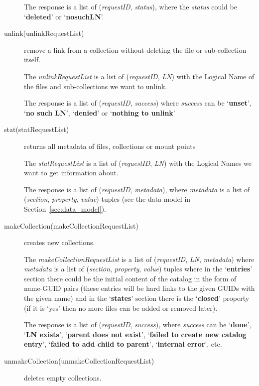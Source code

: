\documentclass{book}
\begin{document}
\begin{description}
    The response is a list of (\emph{requestID}, \emph{status}), where the \emph{status} could be `\textbf{deleted}' or `\textbf{nosuchLN}'.
        
    \item[unlink(unlinkRequestList)] remove a link from a collection without deleting the file or sub-collection itself.
    
    The \emph{unlinkRequestList} is a list of (\emph{requestID}, \emph{LN}) with the Logical Name of the files and sub-collections we want to unlink.
    
    The response is a list of (\emph{requestID}, \emph{success}) where \emph{success} can be `\textbf{unset}', `\textbf{no such LN}', `\textbf{denied}' or `\textbf{nothing to unlink}'
    
    \item[stat(statRequestList)] returns all metadata of files, collections or mount points

    The \emph{statRequestList} is a list of (\emph{requestID}, \emph{LN}) with the Logical Names we want to get information about.
    
    The response is a list of (\emph{requestID}, \emph{metadata}), where \emph{metadata} is a list of (\emph{section}, \emph{property}, \emph{value}) tuples (see the data model in Section~\ref{sec:data_model}).
    
    \item[makeCollection(makeCollectionRequestList)] creates new collections.
    
    The \emph{makeCollectionRequestList} is a list of (\emph{requestID}, \emph{LN}, \emph{metadata}) where \emph{metadata} is a list of (\emph{section}, \emph{property}, \emph{value}) tuples where in the `\textbf{entries}' section there could be the initial content of the catalog in the form of name-GUID pairs (these entries will be hard links to the given GUIDs with the given name) and in the `\textbf{states}' section there is the `\textbf{closed}' property (if it is `yes' then no more files can be added or removed later).
    
    The response is a list of (\emph{requestID}, \emph{success}), where \emph{success} can be `\textbf{done}', `\textbf{LN exists}', `\textbf{parent does not exist}', `\textbf{failed to create new catalog entry}', `\textbf{failed to add child to parent}', `\textbf{internal error}', etc.
    
    \item[unmakeCollection(unmakeCollectionRequestList)] deletes empty collections.


\end{description}
\end{document}
